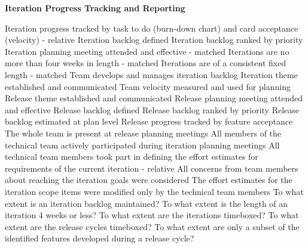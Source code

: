 \textbf{Iteration Progress Tracking and Reporting}
\begin{itemize}
	\taar Iteration progress tracked by task to do (burn-down chart) and card acceptance (velocity) - relative
	\taa Iteration backlog defined
	\taa Iteration backlog ranked by priority
	\taa Iteration planning meeting attended and effective - matched
	\taa Iterations are no more than four weeks in length - matched
	\taa Iterations are of a consistent fixed length - matched
	\taar Team develops and manages iteration backlog
	\taar Iteration theme established and communicated %
	\taar Team velocity measured and used for planning
	\taar Release theme established and communicated 
	\taar Release planning meeting attended and effective 
	\taar Release backlog defined 
	\taar Release backlog ranked by priority 
	\taar Release backlog estimated at plan level 
	\taar Release progress tracked by feature acceptance
	\taar The whole team is present at release planning meetings
	\pamr All members of the technical team actively participated during iteration planning meetings
	\pamr All technical team members took part in defining the effort estimates for 
requirements of the current iteration - relative
	\pamr All concerns from team members about reaching the iteration goals were considered
	\pamr The effort estimates for the iteration scope items were modified only by the  technical team members %
	\ops To what extent is an iteration backlog maintained?
	\ops To what extent is the length of an iteration 4 weeks or less?
	\ops To what extent are the iterations timeboxed?
	\ops To what extent are the release cycles timeboxed? 
	\ops To what extent are only a subset of the identified features developed during a release cycle? 
\end{itemize}

